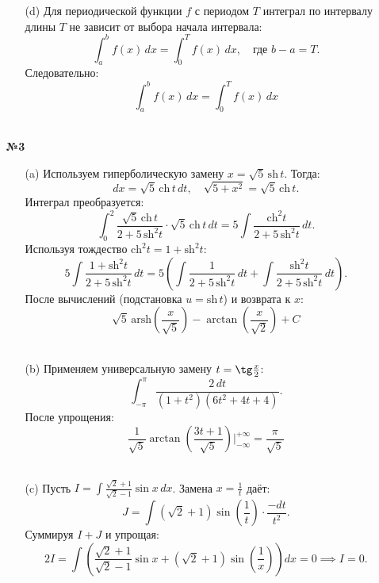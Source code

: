 \documentclass[a4paper]{article}
\begin{document}
\begin{enumerate}
\begin{enumerate}
        \item[(d)]Для периодической функции \(f\) с периодом \(T\) интеграл по интервалу длины \(T\) не зависит от выбора начала интервала:  
        \[
        \int_a^b f(x) \, dx = \int_0^T f(x) \, dx, \quad \text{где } b - a = T.
        \]
        Следовательно:
        $$\int_a^b f(x) \, dx = \int_0^T f(x) \, dx$$\\
    \end{enumerate}

    \item[\textbf{№3}]\begin{enumerate}
        \item[(a)]Используем гиперболическую замену \(x = \sqrt{5} \, \text{sh} \, t\). Тогда:  
        \[
        dx = \sqrt{5} \, \text{ch} \, t \, dt, \quad \sqrt{5 + x^2} = \sqrt{5} \, \text{ch} \, t.
        \]  
        Интеграл преобразуется:  
        \[
        \int_0^2 \frac{\sqrt{5} \, \text{ch} \, t}{2 + 5 \, \text{sh}^2 t} \cdot \sqrt{5} \, \text{ch} \, t \, dt = 5 \int \frac{\text{ch}^2 t}{2 + 5 \, \text{sh}^2 t} \, dt.
        \]  
        Используя тождество \(\text{ch}^2 t = 1 + \text{sh}^2 t\):  
        \[
        5 \int \frac{1 + \text{sh}^2 t}{2 + 5 \, \text{sh}^2 t} \, dt = 5 \left( \int \frac{1}{2 + 5 \, \text{sh}^2 t} \, dt + \int \frac{\text{sh}^2 t}{2 + 5 \, \text{sh}^2 t} \, dt \right).
        \]  
        После вычислений (подстановка \(u = \text{sh} \, t\)) и возврата к \(x\):  
        \[
        \sqrt{5} \, \text{arsh}\left(\frac{x}{\sqrt{5}}\right) - 
        \arctan\left(\frac{x}{\sqrt{2}}\right) + C
        \]\\

        \item[(b)]Применяем универсальную замену \(t = \tg \frac{x}{2}\):  
        \[
        \int_{-\pi}^\pi \frac{2 \, dt}{(1 + t^2)(6t^2 + 4t + 4)}.
        \]  
        После упрощения:  
        \[
        \frac{1}{\sqrt{5}} \arctan\left(\frac{3t + 1}{\sqrt{5}}\right) \Bigg|_{-\infty}^{+\infty} = \frac{\pi}{\sqrt{5}}
        \]  \\

        \item[(c)]Пусть \(I = \int \frac{\sqrt{2} + 1}{\sqrt{2} - 1} \sin x \, dx\). Замена \(x = \frac{1}{t}\) даёт:  
        \[
        J = \int (\sqrt{2} + 1) \sin\left(\frac{1}{t}\right) \cdot \frac{-dt}{t^2}.
        \]  
        Суммируя \(I + J\) и упрощая:  
        \[
        2I = \int \left(\frac{\sqrt{2} + 1}{\sqrt{2} - 1} \sin x + (\sqrt{2} + 1) \sin\left(\frac{1}{x}\right)\right) dx = 0 \implies I = 0.
        \]  \\


\end{enumerate}
\end{enumerate}
\end{document}
